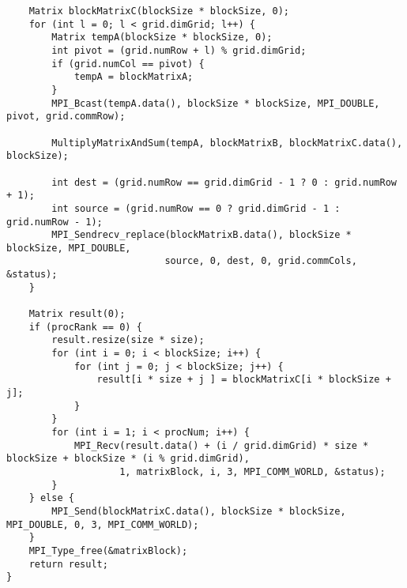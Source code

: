 \documentclass{report}
\begin{document}
\begin{lstlisting}
    Matrix blockMatrixC(blockSize * blockSize, 0);
    for (int l = 0; l < grid.dimGrid; l++) {
        Matrix tempA(blockSize * blockSize, 0);
        int pivot = (grid.numRow + l) % grid.dimGrid;
        if (grid.numCol == pivot) {
            tempA = blockMatrixA;
        }
        MPI_Bcast(tempA.data(), blockSize * blockSize, MPI_DOUBLE, pivot, grid.commRow);

        MultiplyMatrixAndSum(tempA, blockMatrixB, blockMatrixC.data(), blockSize);

        int dest = (grid.numRow == grid.dimGrid - 1 ? 0 : grid.numRow + 1);
        int source = (grid.numRow == 0 ? grid.dimGrid - 1 : grid.numRow - 1);
        MPI_Sendrecv_replace(blockMatrixB.data(), blockSize * blockSize, MPI_DOUBLE,
                            source, 0, dest, 0, grid.commCols, &status);
    }

    Matrix result(0);
    if (procRank == 0) {
        result.resize(size * size);
        for (int i = 0; i < blockSize; i++) {
            for (int j = 0; j < blockSize; j++) {
                result[i * size + j ] = blockMatrixC[i * blockSize + j];
            }
        }
        for (int i = 1; i < procNum; i++) {
            MPI_Recv(result.data() + (i / grid.dimGrid) * size * blockSize + blockSize * (i % grid.dimGrid),
                    1, matrixBlock, i, 3, MPI_COMM_WORLD, &status);
        }
    } else {
        MPI_Send(blockMatrixC.data(), blockSize * blockSize, MPI_DOUBLE, 0, 3, MPI_COMM_WORLD);
    }
    MPI_Type_free(&matrixBlock);
    return result;
}

\end{lstlisting}
\end{document}
